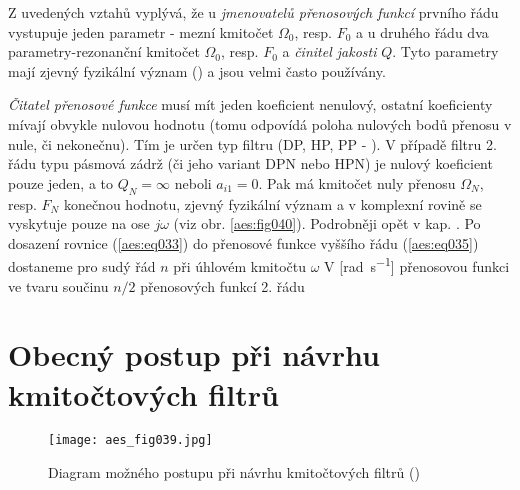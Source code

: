           Z uvedených vztahů vyplývá, že u \emph{jmenovatelů přenosových funkcí} prvního řádu
          vystupuje jeden parametr - mezní kmitočet \(\Omega_0\), resp. \(F_0\) a u druhého řádu dva
          parametry-rezonanční kmitočet \(\Omega_0\), resp. \(F_0\) a \emph{činitel jakosti} \(Q\).
          Tyto parametry mají zjevný fyzikální význam () a jsou
          velmi často používány. 
          
          \emph{Čitatel přenosové funkce} musí mít jeden koeficient nenulový, ostatní koeficienty
          mívají obvykle nulovou hodnotu (tomu odpovídá poloha nulových bodů přenosu v nule, či
          nekonečnu). Tím je určen typ filtru (DP, HP, PP - ). V případě
          filtru 2. řádu typu pásmová zádrž (či jeho variant DPN nebo HPN) je nulový koeficient
          pouze jeden, a to \(Q_N = \infty\) neboli \(a_{i1} = 0\). Pak má kmitočet nuly přenosu
          \(\Omega_N\), resp. \(F_N\) konečnou hodnotu, zjevný fyzikální význam a v komplexní rovině
          se vyskytuje pouze na ose \(j\omega\) (viz obr. \ref{aes:fig040}). Podrobněji opět v kap.
          . Po dosazení rovnice (\ref{aes:eq033}) do přenosové funkce
          vyššího řádu (\ref{aes:eq035}) dostaneme pro sudý řád \(n\) při úhlovém kmitočtu
          \(\omega\) V [\unit{\radian\per\second}] přenosovou funkci ve tvaru součinu \(n/2\) přenosových
          funkcí 2. řádu
          

  \section{Obecný postup při návrhu kmitočtových filtrů}
    \begin{figure}[ht!]  %
      \centering
      \texttt{[image: aes\_fig039.jpg]}
      \caption{Diagram možného postupu při návrhu kmitočtových filtrů
              (\cite[s.~44]{HajekSedlacek2002})}
      \label{aes:fig039}    
    \end{figure}

